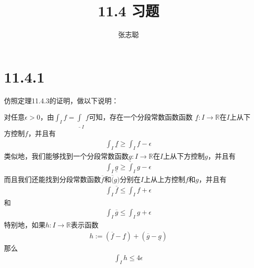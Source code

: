\documentclass{article}
\begin{document}
\title{11.4 习题}
\author{张志聪}
\maketitle

\section*{11.4.1}

仿照定理11.4.3的证明，做以下说明：

对任意$\epsilon > 0$，由$\int_I f = \underline{\int}_I f$可知，存在一个分段常数函数函数
$\underline{f} : I \to \mathbb{R}$在$I$上从下方控制$f$，并且有
\begin{align*}
  \int_I \underline{f} \geq \int_I f - \epsilon
\end{align*}
类似地，我们能够找到一个分段常数函数$\underline{g}: I \to \mathbb{R}$在$I$上从下方控制$g$，并且有
\begin{align*}
  \int_I \underline{g} \geq \int_I g - \epsilon
\end{align*}
而且我们还能找到分段常数函数$\overline{f}$和$\overline(g)$分别在$I$上从上方控制$f$和$g$，并且有
\begin{align*}
  \int_I \overline{f} \leq \int_I f + \epsilon
\end{align*}
和
\begin{align*}
  \int_I \overline{g} \leq \int_I g + \epsilon
\end{align*}
特别地，如果$h : I \to \mathbb{R}$表示函数
\begin{align*}
  h := (\overline{f} - \underline{f}) + (\overline{g} - \underline{g})
\end{align*}
那么
\begin{align*}
  \int_I h \leq 4\epsilon
\end{align*}
\end{document}
